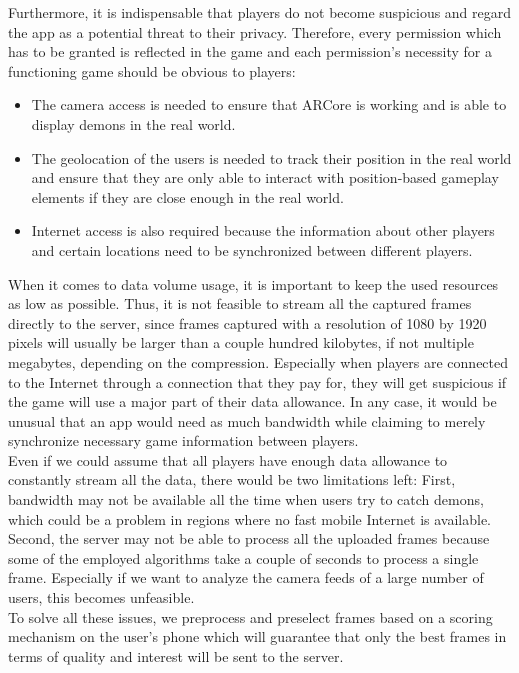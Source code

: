 Furthermore, it is indispensable that players do not become suspicious and regard the app as a potential threat to their privacy.
Therefore, every permission which has to be granted is reflected in the game and each permission's necessity for a functioning game should be obvious to players:
\begin{itemize}
    \item The camera access is needed to ensure that ARCore is working and is able to display demons in the real world.
    \item The geolocation of the users is needed to track their position in the real world and ensure that they are only able to interact with position-based gameplay elements if they are close enough in the real world. 
    \item Internet access is also required because the information about other players and certain locations need to be synchronized between different players.
\end{itemize}

When it comes to data volume usage, it is important to keep the used resources as low as possible. 
Thus, it is not feasible to stream all the captured frames directly to the server, since frames captured with a resolution of 1080 by 1920 pixels will usually be larger than a couple hundred kilobytes, if not multiple megabytes, depending on the compression.
Especially when players are connected to the Internet through a connection that they pay for, they will get suspicious if the game will use a major part of their data allowance.
In any case, it would be unusual that an app would need as much bandwidth while claiming to merely synchronize necessary game information between players.\\
Even if we could assume that all players have enough data allowance to constantly stream all the data, there would be two limitations left:
First, bandwidth may not be available all the time when users try to catch demons, which could be a problem in regions where no fast mobile Internet is available.
Second, the server may not be able to process all the uploaded frames because some of the employed algorithms take a couple of seconds to process a single frame.
Especially if we want to analyze the camera feeds of a large number of users, this becomes unfeasible.\\
To solve all these issues, we preprocess and preselect frames based on a scoring mechanism on the user's phone which will guarantee that only the best frames in terms of quality and interest will be sent to the server.


